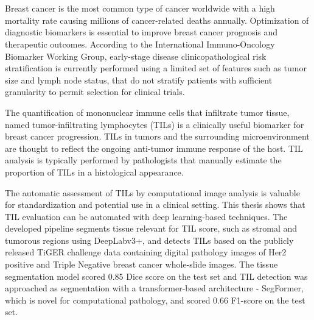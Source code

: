 \chapter{\abstractname}

Breast cancer is the most common type of cancer worldwide with a high mortality rate causing millions of cancer-related deaths annually.
Optimization of diagnostic biomarkers is essential to improve breast cancer prognosis and therapeutic outcomes.
According to the International Immuno-Oncology Biomarker Working Group, early-stage disease clinicopathological risk stratification is currently performed using a limited set of features such as tumor size and lymph node status, that do not stratify patients with sufficient granularity to permit selection for clinical trials. 

The quantification of mononuclear immune cells that infiltrate tumor tissue, named tumor-infiltrating lymphocytes (TILs) is a clinically useful biomarker for breast cancer progression.
TILs in tumors and the surrounding microenvironment are thought to reflect the ongoing anti-tumor immune response of the host.
TIL analysis is typically performed by pathologists that manually estimate the proportion of TILs in a histological appearance.

The automatic assessment of TILs by computational image analysis is valuable for standardization and potential use in a clinical setting.
This thesis shows that TIL evaluation can be automated with deep learning-based techniques. The developed pipeline segments tissue relevant for TIL score, such as stromal and tumorous regions using DeepLabv3+, and detects TILs based on the publicly released TiGER challenge data containing digital pathology images of Her2 positive and Triple Negative breast cancer whole-slide images.
The tissue segmentation model scored 0.85 Dice score on the test set and TIL detection was approached as segmentation with a transformer-based architecture - SegFormer, which is novel for computational pathology, and scored 0.66 F1-score on the test set.


